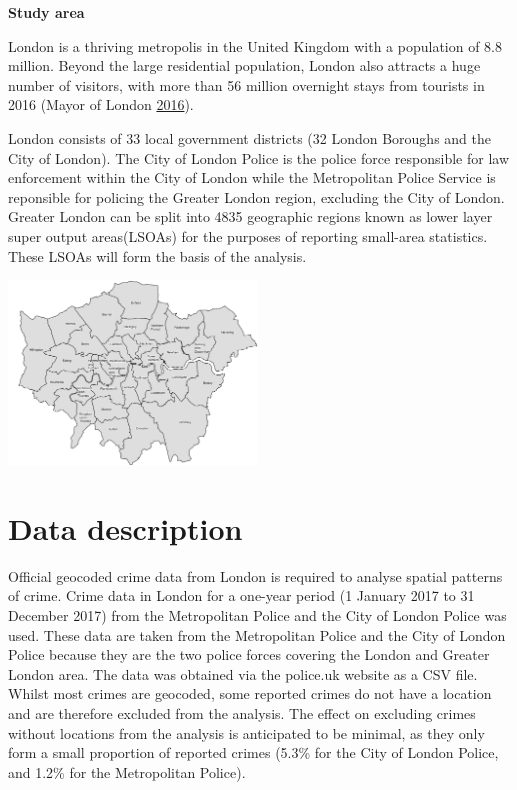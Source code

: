 \documentclass[]{article}
\theoremstyle{definition}
\theoremstyle{definition}
\theoremstyle{definition}
\theoremstyle{remark}
\begin{document}
\textbf{Study area}

London is a thriving metropolis in the United Kingdom with a population
of 8.8 million. Beyond the large residential population, London also
attracts a huge number of visitors, with more than 56 million overnight
stays from tourists in 2016 (Mayor of London
\protect\hyperlink{ref-MayorofLondon2016}{2016}).

London consists of 33 local government districts (32 London Boroughs and
the City of London). The City of London Police is the police force
responsible for law enforcement within the City of London while the
Metropolitan Police Service is reponsible for policing the Greater
London region, excluding the City of London. Greater London can be split
into 4835 geographic regions known as lower layer super output
areas(LSOAs) for the purposes of reporting small-area statistics. These
LSOAs will form the basis of the analysis.

\includegraphics[width=2.60417in]{pictures/London.png} \pagebreak

\section{Data description}\label{data-description}

Official geocoded crime data from London is required to analyse spatial
patterns of crime. Crime data in London for a one-year period (1 January
2017 to 31 December 2017) from the Metropolitan Police and the City of
London Police was used. These data are taken from the Metropolitan
Police and the City of London Police because they are the two police
forces covering the London and Greater London area. The data was
obtained via the police.uk website as a CSV file. Whilst most crimes are
geocoded, some reported crimes do not have a location and are therefore
excluded from the analysis. The effect on excluding crimes without
locations from the analysis is anticipated to be minimal, as they only
form a small proportion of reported crimes (5.3\% for the City of London
Police, and 1.2\% for the Metropolitan Police).
\end{document}
